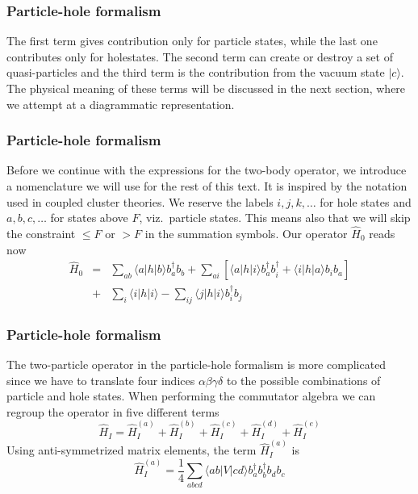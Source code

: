 \documentclass[compress]{beamer}
\newcommand*{\ket}[1]{|#1\rangle}
\newcommand*{\bra}[1]{\langle#1|}
\newcommand{\element}[3]
        {\bra{#1}#2\ket{#3}}
\begin{document}
\frame
{
  \frametitle{Particle-hole formalism}
\begin{small}
{\scriptsize
The first term  gives contribution only for particle states, while the last one
contributes only for holestates. The second term can create or destroy a set of
quasi-particles and 
the third term is the contribution  from the vacuum state $\ket{c}$.
The physical meaning
of these terms  will be discussed in the next section, where we attempt at a diagrammatic
representation. 
}
\end{small}
}
\frame
{
  \frametitle{Particle-hole formalism}
\begin{small}
{\scriptsize
Before we continue with the expressions for the two-body operator, we introduce a nomenclature we will use for the rest of this
text. It is inspired by the notation used in coupled cluster theories.
We reserve the labels $i,j,k,\dots$ for hole states and $a,b,c,\dots$ for states above $F$, viz.~particle states.
This means also that we will skip the constraint $\leq F$ or $> F$ in the summation symbols. 
Our operator $\hat{H}_0$  reads now 
\begin{eqnarray}
	\hat{H}_0 &=& \sum_{ab} \element{a}{h}{b}  b_a^\dagger b_b +
		\sum_{ai} \left[
		\element{a}{h}{i} b_a^\dagger b_i^\dagger + 
		\element{i}{h}{a} b_i  b_a \right] \nonumber \\
	&+& \sum_{i} \element{i}{h}{i} - 
		\sum_{ij} \element{j}{h}{i}
		b_i^\dagger b_j \label{eq:2-63b}
\end{eqnarray} 
}
\end{small}
}
\frame
{
  \frametitle{Particle-hole formalism}
\begin{small}
{\scriptsize
The two-particle operator in the particle-hole formalism  is more complicated since we have
to translate four indices $\alpha\beta\gamma\delta$ to the possible combinations of particle and hole
states.  When performing the commutator algebra we can regroup the operator in five different terms
\begin{equation}
	\hat{H}_I = \hat{H}_I^{(a)} + \hat{H}_I^{(b)} + \hat{H}_I^{(c)} + \hat{H}_I^{(d)} + \hat{H}_I^{(e)} \label{eq:2-65}
\end{equation}
Using anti-symmetrized  matrix elements, 
the term  $\hat{H}_I^{(a)}$ is  
\begin{equation}
	\hat{H}_I^{(a)} = \frac{1}{4}
	\sum_{abcd} \element{ab}{V}{cd} 
		b_a^\dagger b_b^\dagger b_d b_c \label{eq:2-66}
\end{equation}
}
\end{small}
}
\frame
\end{document}
